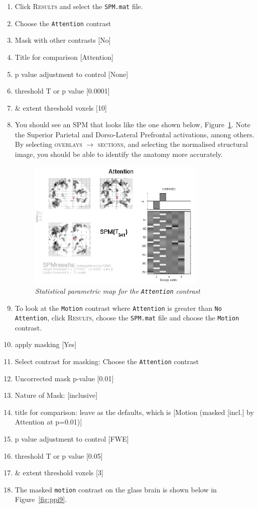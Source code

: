 \begin{enumerate}
\item Click \textsc{Results} and select the \texttt{SPM.mat} file.
\item Choose the \texttt{Attention} contrast
\item Mask with other contrasts [No]
\item Title for comparison [Attention]
\item p value adjustment to control [None]
\item threshold {T or p value} [0.0001]
\item \& extent threshold {voxels} [10]
\item You should see an SPM that looks like the one shown below, Figure~\ref{fig:ppi8}. Note the Superior Parietal and Dorso-Lateral Prefrontal activations, among others. By selecting \textsc{overlays} $\rightarrow$ \textsc{sections}, and selecting the normalised structural image, you should be able to identify the anatomy more accurately.

\begin{figure}[!ht]
\centering\includegraphics[width=85mm]{ppi/figures/Fig8.png}
\caption{\em Statistical parametric map for the \texttt{Attention} contrast}
\label{fig:ppi8}
\end{figure}

\item To look at the \texttt{Motion} contrast where \texttt{Attention} is greater than \texttt{No Attention}, click \textsc{Results}, choose the \texttt{SPM.mat} file and choose the \texttt{Motion} contrast.
\item apply masking [Yes]
\item Select contrast for masking: Choose the \texttt{Attention} contrast
\item Uncorrected mask p-value [0.01]
\item Nature of Mask: [inclusive]
\item title for comparison: leave as the defaults, which is [Motion  (masked [incl.] by Attention at p=0.01)]
\item p value adjustment to control [FWE]
\item threshold {T or p value} [0.05]
\item \& extent threshold {voxels} [3]
\item The masked \texttt{motion} contrast on the glass brain is shown below in Figure~\ref{fig:ppi9}.


\end{enumerate}
